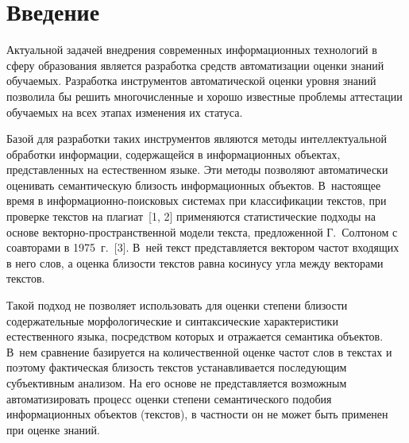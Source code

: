       \begin{multicols}{2}

            \label{st\stat}


\section{Введение}

Актуальной задачей внедрения современных информационных технологий в сферу 
образования является разработка средств автоматизации оценки знаний обучаемых. 
Разработка инструментов автоматической оценки уровня знаний позволила бы 
решить многочисленные и хорошо известные проблемы аттестации обучаемых на 
всех этапах изменения их статуса. 
     
     Базой для разработки таких инструментов являются методы интеллектуальной 
обработки информации, содержащейся в информационных объектах, 
представленных на естественном языке. Эти методы позволяют автоматически 
оценивать семантическую близость информационных объектов. В~настоящее время 
в ин\-фор\-ма\-ци\-он\-но-по\-иско\-вых системах при классификации текстов, при 
проверке текстов на плагиат~[1, 2] применяются статистические подходы на основе 
век\-тор\-но-про\-стран\-ст\-вен\-ной модели текста, предложенной Г.~Солтоном 
с соавторами в 
1975~г.~[3]. В~ней текст представляется вектором частот входящих в него слов, а 
оценка близости текстов равна косинусу угла между векторами текстов. 
     
     Такой подход не позволяет использовать для оценки степени близости 
содержательные морфологические и синтаксические характеристики естественного 
языка, посредством которых и отражается семантика объектов. В~нем сравнение 
базируется на количественной оценке частот слов в текстах и поэтому фактическая 
близость текстов устанавливается последующим субъективным анализом. На его 
основе не представляется возможным автоматизировать процесс оценки степени 
семантического подобия информационных объектов (текстов), в частности он не 
может быть применен при оценке знаний.
     

\end{multicols}
